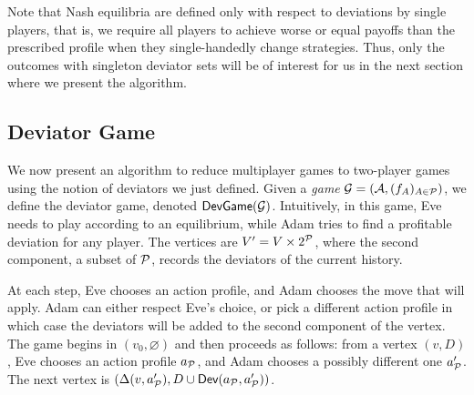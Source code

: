 Note that Nash equilibria are defined only with respect to deviations by
single players, that is, we require all players to achieve worse or equal
payoffs than the prescribed profile when they single-handedly change
strategies. Thus, only the outcomes with singleton deviator sets
will be of interest for us in the next section where we present the algorithm.




\subsection{Deviator Game}\label{deviator-game}
We now present an algorithm to reduce multiplayer games to two-player games
using the notion of deviators we just defined.
Given a \emph{game}
\(\mathcal{G} = (\mathcal{A}, (f_A)_{A \in \mathcal{P}})\),
we define the deviator game, denoted \(\textsf{DevGame}(\mathcal{G})\).
Intuitively, in this game, Eve needs to play
according to an equilibrium, while Adam tries to find a profitable
deviation for any player. The vertices are \(V' = V \times 2^{\mathcal{P}}\),
where the second component, a subset of \(\mathcal{P}\), records the deviators
of the current history.

At each step, Eve chooses an action profile, and Adam chooses the move
that will apply. Adam can either respect Eve's choice, or pick a
different action profile in which case the deviators will be added to
the second component of the vertex. The game begins in
\((v_0 , \varnothing)\) and then proceeds as follows: from a vertex
\((v, D)\), Eve chooses an action profile \(a_{\mathcal{P}}\), and Adam chooses
a possibly different one \(a'_{\mathcal{P}}\). The next vertex is
\((\Delta(v, a'_{\mathcal{P}} ), D \cup \textsf{Dev}(a_{\mathcal{P}} , a'_{\mathcal{P}} ))\).

